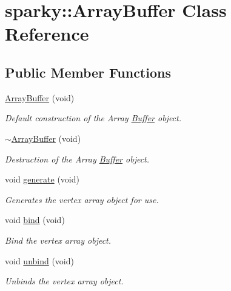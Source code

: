 \hypertarget{classsparky_1_1_array_buffer}{}\section{sparky\+:\+:Array\+Buffer Class Reference}
\label{classsparky_1_1_array_buffer}
\subsection*{Public Member Functions}
\begin{DoxyCompactItemize}
\item 
\hyperlink{classsparky_1_1_array_buffer_a5b280f72784afe7be074a0fc59c4b959}{Array\+Buffer} (void)
\begin{DoxyCompactList}\small\item\em Default construction of the Array \hyperlink{classsparky_1_1_buffer}{Buffer} object. \end{DoxyCompactList}\item 
\hyperlink{classsparky_1_1_array_buffer_a6684f08966fd9eb421cfd2aaefcd98e8}{$\sim$\+Array\+Buffer} (void)
\begin{DoxyCompactList}\small\item\em Destruction of the Array \hyperlink{classsparky_1_1_buffer}{Buffer} object. \end{DoxyCompactList}\item 
void \hyperlink{classsparky_1_1_array_buffer_a73e0c1130fd0150a7f15fd17d3af8cf0}{generate} (void)
\begin{DoxyCompactList}\small\item\em Generates the vertex array object for use. \end{DoxyCompactList}\item 
void \hyperlink{classsparky_1_1_array_buffer_a0e1aec35bd2a9ae51c95886b7c539575}{bind} (void)\hypertarget{classsparky_1_1_array_buffer_a0e1aec35bd2a9ae51c95886b7c539575}{}\label{classsparky_1_1_array_buffer_a0e1aec35bd2a9ae51c95886b7c539575}

\begin{DoxyCompactList}\small\item\em Bind the vertex array object. \end{DoxyCompactList}\item 
void \hyperlink{classsparky_1_1_array_buffer_a9727f0514487b5eb3e2815505d7a83b9}{unbind} (void)\hypertarget{classsparky_1_1_array_buffer_a9727f0514487b5eb3e2815505d7a83b9}{}\label{classsparky_1_1_array_buffer_a9727f0514487b5eb3e2815505d7a83b9}

\begin{DoxyCompactList}\small\item\em Unbinds the vertex array object. \end{DoxyCompactList}\end{DoxyCompactItemize}


